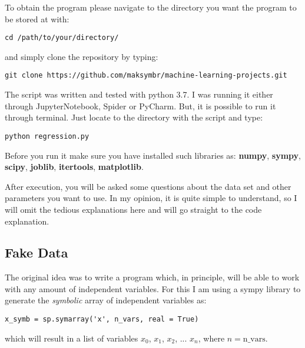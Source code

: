 To obtain the program please navigate to the directory you want the program to be stored at with:
\begin{lstlisting}
cd /path/to/your/directory/
\end{lstlisting}
and simply clone the repository by typing:
\begin{lstlisting}
git clone https://github.com/maksymbr/machine-learning-projects.git
\end{lstlisting}

The script was written and tested with python 3.7. I was running it either through JupyterNotebook, Spider or PyCharm. But, it is possible to run it through terminal. Just locate to the directory with the script and type:
\begin{lstlisting}
python regression.py
\end{lstlisting}

Before you run it make sure you have installed such libraries as: \textbf{numpy}, \textbf{sympy}, \textbf{scipy}, \textbf{joblib}, \textbf{itertools}, \textbf{matplotlib}.

After execution, you will be asked some questions about the data set and other parameters you want to use. In my opinion, it is quite simple to understand, so I will omit the tedious explanations here and will go straight to the code explanation.

\subsection{Fake Data}

The original idea was to write a program which, in principle, will be able to work with any amount of independent variables. For this I am using a sympy library to generate the \textit{symbolic} array of independent variables as:
\begin{lstlisting}
x_symb = sp.symarray('x', n_vars, real = True)
\end{lstlisting}
which will result in a list of variables $x_0$, $x_1$, $x_2$, ... $x_n$, where $n=\mathrm{n\_vars}$.

